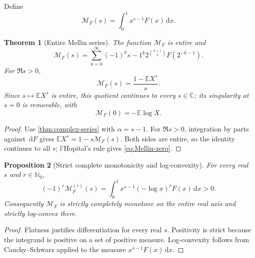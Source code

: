 \documentclass[11pt,oneside]{article}
\numberwithin{equation}{section}
\newtheorem{theorem}{Theorem}[section]
\newtheorem{proposition}[theorem]{Proposition}
\theoremstyle{definition}
\theoremstyle{remark}
\newcommand{\C}{\mathbb C}
\newcommand{\N}{\mathbb N}
\newcommand{\E}{\mathbb E}
\newcommand{\Mellin}{\mathcal M}
\newcommand{\dd}{\,\mathrm d}
\newcommand{\fall}[2]{#1^{\underline{#2}}}
\begin{document}
Define
\begin{equation}
 \Mellin_F(s)=\int_0^1x^{s-1}F(x)\dd x.                   \label{eq:Mellin-def}
\end{equation}

\begin{theorem}[Entire Mellin series]
\label{thm:mellin-entire}
The function $\Mellin_F$ is entire and
\begin{equation}
 \boxed{
 \Mellin_F(s)=\sum_{k=0}^{\infty}(-1)^k\fall{s-1}{k}
 2^{\binom{k+1}{2}}F(2^{-k-1}).}                          \label{eq:Mellin-series}
\end{equation}
For $\Re s>0$,
\begin{equation}
 \Mellin_F(s)=\frac{1-\E X^s}{s}.                        \label{eq:Mellin-prob}
\end{equation}
Since $s\mapsto\E X^s$ is entire, this quotient continues to every
$s\in\C$; its singularity at $s=0$ is removable, with
\begin{equation}
 \Mellin_F(0)=-\E\log X.                                 \label{eq:Mellin-zero}
\end{equation}
\end{theorem}

\begin{proof}
Use \cref{thm:complex-series} with $\alpha=s-1$.  For $\Re s>0$, integration
by parts against $\dd F$ gives
$\E X^s=1-s\Mellin_F(s)$.  Both sides are entire, so the identity
continues to all $s$; l'Hopital's rule gives \eqref{eq:Mellin-zero}.
\end{proof}

\begin{proposition}[Strict complete monotonicity and log-convexity]
\label{prop:mellin-cm}
For every real $s$ and $r\in\N_0$,
\begin{equation}
 (-1)^r\Mellin_F^{(r)}(s)
 =\int_0^1x^{s-1}(-\log x)^rF(x)\dd x>0.                  \label{eq:Mellin-cm}
\end{equation}
Consequently $\Mellin_F$ is strictly completely monotone on the entire real
axis and strictly log-convex there.
\end{proposition}

\begin{proof}
Flatness justifies differentiation for every real $s$.  Positivity is strict
because the integrand is positive on a set of positive measure.  Log-convexity
follows from Cauchy--Schwarz applied to the measure
$x^{s-1}F(x)\dd x$.
\end{proof}
\end{document}
